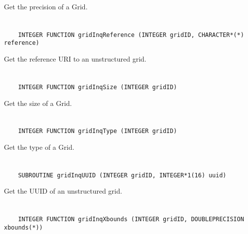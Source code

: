 Get the precision of a Grid.


\section*{\tt {}}

\begin{verbatim}
    INTEGER FUNCTION gridInqReference (INTEGER gridID, CHARACTER*(*) reference)
\end{verbatim}

Get the reference URI to an unstructured grid.


\section*{\tt {}}

\begin{verbatim}
    INTEGER FUNCTION gridInqSize (INTEGER gridID)
\end{verbatim}

Get the size of a Grid.


\section*{\tt {}}

\begin{verbatim}
    INTEGER FUNCTION gridInqType (INTEGER gridID)
\end{verbatim}

Get the type of a Grid.


\section*{\tt {}}

\begin{verbatim}
    SUBROUTINE gridInqUUID (INTEGER gridID, INTEGER*1(16) uuid)
\end{verbatim}

Get the UUID of an unstructured grid.


\section*{\tt {}}

\begin{verbatim}
    INTEGER FUNCTION gridInqXbounds (INTEGER gridID, DOUBLEPRECISION xbounds(*))
\end{verbatim}

